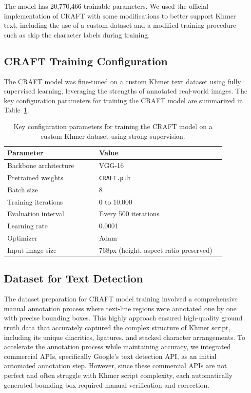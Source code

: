 {The model has 20,770,466 trainable parameters. We used the official 
implementation of CRAFT with some modifications to better support Khmer text,
including the use of a custom dataset and a modified training procedure such as
skip the character labels during training.


\subsection{CRAFT Training Configuration}
\label{subsec:craft-training-config}

The CRAFT model was fine-tuned on a custom Khmer text dataset using fully supervised learning, 
leveraging the strengths of annotated real-world images. The key configuration parameters 
for training the CRAFT model are summarized in Table~\ref{tab:craft-training-config}.

\begin{table}[H]
    \renewcommand{\arraystretch}{1.3} %
    \centering
    \begin{tabular}{|p{0.4\linewidth}|p{0.55\linewidth}|}
    \hline
    \textbf{Parameter} & \textbf{Value} \\
    \hline
    Backbone architecture & VGG-16 \\
    Pretrained weights & \texttt{CRAFT.pth} \\
    Batch size & 8 \\
    Training iterations & 0 to 10,000 \\
    Evaluation interval & Every 500 iterations \\
    Learning rate & 0.0001 \\
    Optimizer & Adam \\
    Input image size & 768px (height, aspect ratio preserved) \\
    \hline
    \end{tabular}
    \caption{Key configuration parameters for training the CRAFT model on a custom Khmer dataset using strong supervision.}
    \label{tab:craft-training-config}
\end{table}


\subsection{Dataset for Text Detection}
\label{subsec:craft-dataset}

{\englishfont The dataset preparation for CRAFT model training involved a comprehensive manual 
annotation process where text-line regions were annotated one by one with precise 
bounding boxes. This highly approach ensured high-quality ground truth data 
that accurately captured the complex structure of Khmer script, including its 
unique diacritics, ligatures, and stacked character arrangements.
To accelerate the annotation process while maintaining accuracy, we integrated 
commercial APIs, specifically Google's text detection API, as an initial automated 
annotation step. However, since these commercial APIs are not perfect and often 
struggle with Khmer script complexity, each automatically generated bounding box 
required manual verification and correction. }


}

